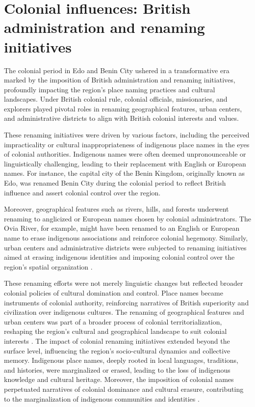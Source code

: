 \section{Colonial influences: British administration and renaming initiatives}

The colonial period in Edo and Benin City ushered in a transformative era marked by the imposition of British administration and renaming initiatives, profoundly impacting the region's place naming practices and cultural landscapes. Under British colonial rule, colonial officials, missionaries, and explorers played pivotal roles in renaming geographical features, urban centers, and administrative districts to align with British colonial interests and values\cite{Afigbo1982}. 

These renaming initiatives were driven by various factors, including the perceived impracticality or cultural inappropriateness of indigenous place names in the eyes of colonial authorities. Indigenous names were often deemed unpronounceable or linguistically challenging, leading to their replacement with English or European names\cite{crowder2023british}. For instance, the capital city of the Benin Kingdom, originally known as Edo, was renamed Benin City during the colonial period to reflect British influence and assert colonial control over the region\cite{egharevba1968short}.

Moreover, geographical features such as rivers, hills, and forests underwent renaming to anglicized or European names chosen by colonial administrators. The Ovia River, for example, might have been renamed to an English or European name to erase indigenous associations and reinforce colonial hegemony. Similarly, urban centers and administrative districts were subjected to renaming initiatives aimed at erasing indigenous identities and imposing colonial control over the region's spatial organization \cite{Igbafe}.

These renaming efforts were not merely linguistic changes but reflected broader colonial policies of cultural domination and control. Place names became instruments of colonial authority, reinforcing narratives of British superiority and civilization over indigenous cultures. The renaming of geographical features and urban centers was part of a broader process of colonial territorialization, reshaping the region's cultural and geographical landscape to suit colonial interests \cite{Igbafe}.
The impact of colonial renaming initiatives extended beyond the surface level, influencing the region's socio-cultural dynamics and collective memory. Indigenous place names, deeply rooted in local languages, traditions, and histories, were marginalized or erased, leading to the loss of indigenous knowledge and cultural heritage. Moreover, the imposition of colonial names perpetuated narratives of colonial dominance and cultural erasure, contributing to the marginalization of indigenous communities and identities \cite{Igbafe}.

